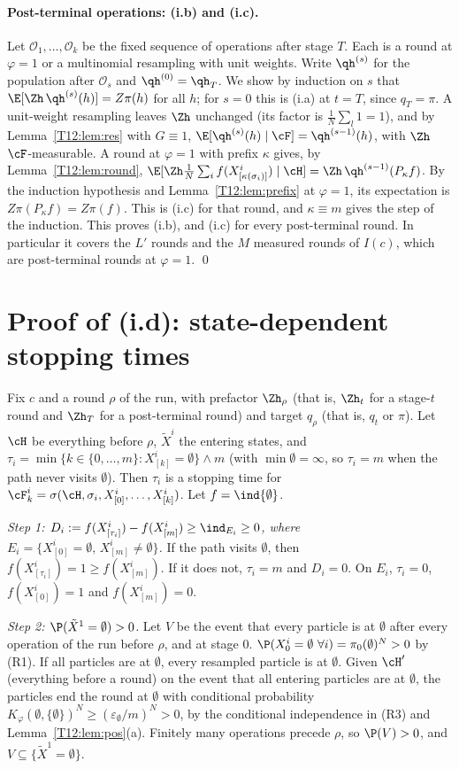 \documentclass[11pt]{report}
\begin{document}
\paragraph{Post-terminal operations: (i.b) and (i.c).} Let $\mathcal O_1,\dots,\mathcal O_k$ be the fixed sequence of operations after stage $T$. Each is a round at $\varphi=1$ or a multinomial resampling with unit weights. Write $\qh^{(s)}$ for the population after $\mathcal O_s$ and $\qh^{(0)}=\qh_T$. We show by induction on $s$ that $\E[\Zh\,\qh^{(s)}(h)]=Z\pi(h)$ for all $h$; for $s=0$ this is (i.a) at $t=T$, since $q_T=\pi$. A unit-weight resampling leaves $\Zh$ unchanged (its factor is $\frac1N\sum_l1=1$), and by Lemma~\ref{T12:lem:res} with $G\equiv1$, $\E[\qh^{(s)}(h)\mid\cF]=\qh^{(s-1)}(h)$, with $\Zh$ $\cF$-measurable. A round at $\varphi=1$ with prefix $\kappa$ gives, by Lemma~\ref{T12:lem:round}, $\E[\Zh\frac1N\sum_if(X^i_{[\kappa(\sigma_i)]})\mid\cH]=\Zh\,\qh^{(s-1)}(P_\kappa f)$. By the induction hypothesis and Lemma~\ref{T12:lem:prefix} at $\varphi=1$, its expectation is $Z\pi(P_\kappa f)=Z\pi(f)$. This is (i.c) for that round, and $\kappa\equiv m$ gives the step of the induction. This proves (i.b), and (i.c) for every post-terminal round. In particular it covers the $L'$ rounds and the $M$ measured rounds of $I(c)$, which are post-terminal rounds at $\varphi=1$. \qed

\section{Proof of (i.d): state-dependent stopping times}

Fix $c$ and a round $\rho$ of the run, with prefactor $\Zh_\rho$ (that is, $\Zh_t$ for a stage-$t$ round and $\Zh_T$ for a post-terminal round) and target $q_\rho$ (that is, $q_t$ or $\pi$). Let $\cH$ be everything before $\rho$, $\tilde X^i$ the entering states, and $\tau_i=\min\{k\in\{0,\dots,m\}: X^i_{[k]}=\emptyset\}\wedge m$ (with $\min\emptyset=\infty$, so $\tau_i=m$ when the path never visits $\emptyset$). Then $\tau_i$ is a stopping time for $\cF^i_k=\sigma(\cH,\sigma_i,X^i_{[0]},\dots,X^i_{[k]})$. Let $f=\ind\{\emptyset\}$.

\emph{Step 1: $D_i:=f(X^i_{[\tau_i]})-f(X^i_{[m]})\ge \ind_{E_i}\ge 0$, where $E_i=\{X^i_{[0]}=\emptyset,\,X^i_{[m]}\ne\emptyset\}$.} If the path visits $\emptyset$, then $f(X^i_{[\tau_i]})=1\ge f(X^i_{[m]})$. If it does not, $\tau_i=m$ and $D_i=0$. On $E_i$, $\tau_i=0$, $f(X^i_{[0]})=1$ and $f(X^i_{[m]})=0$.

\emph{Step 2: $\P(\tilde X^1=\emptyset)>0$.} Let $V$ be the event that every particle is at $\emptyset$ after every operation of the run before $\rho$, and at stage 0. $\P(X_0^i=\emptyset\ \forall i)=\pi_0(\emptyset)^N>0$ by (R1). If all particles are at $\emptyset$, every resampled particle is at $\emptyset$. Given $\cH'$ (everything before a round) on the event that all entering particles are at $\emptyset$, the particles end the round at $\emptyset$ with conditional probability $K_\varphi(\emptyset,\{\emptyset\})^N\ge(\varepsilon_\emptyset/m)^N>0$, by the conditional independence in (R3) and Lemma~\ref{T12:lem:pos}(a). Finitely many operations precede $\rho$, so $\P(V)>0$, and $V\subseteq\{\tilde X^1=\emptyset\}$.
\end{document}
